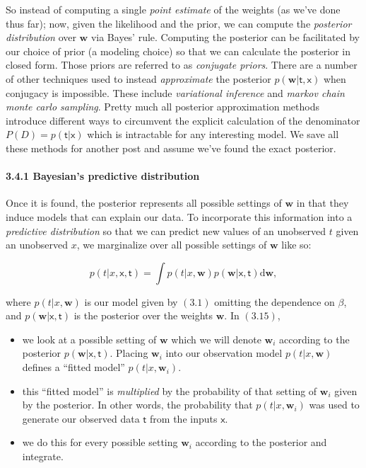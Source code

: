 \documentclass[
  0.875em,
  letterpaper,
  DIV=11,
  numbers=noendperiod]{scrartcl}
\let\oldparagraph\paragraph
\renewcommand{\paragraph}[1]{\oldparagraph{#1}\mbox{}}
\providecommand{\tightlist}{%
  \setlength{\itemsep}{0pt}\setlength{\parskip}{0pt}}\usepackage{longtable,booktabs,array}
\begin{document}
So instead of computing a single \emph{point estimate} of the weights
(as we've done thus far); now, given the likelihood and the prior, we
can compute the \emph{posterior distribution} over \(\mathbf{w}\) via
Bayes' rule. Computing the posterior can be facilitated by our choice of
prior (a modeling choice) so that we can calculate the posterior in
closed form. Those priors are referred to as \emph{conjugate priors}.
There are a number of other techniques used to instead
\emph{approximate} the posterior
\(p(\mathbf{w}|\pmb{\mathsf{t}}, \pmb{\mathsf{x}})\) when conjugacy is
impossible. These include \emph{variational inference} and \emph{markov
chain monte carlo sampling}. Pretty much all posterior approximation
methods introduce different ways to circumvent the explicit calculation
of the denominator \(P(D) = p(\pmb{\mathsf{t}}|\pmb{\mathsf{x}})\) which
is intractable for any interesting model. We save all these methods for
another post and assume we've found the exact posterior.

\hypertarget{bayesians-predictive-distribution}{%
\paragraph{\texorpdfstring{\textbf{3.4.1 Bayesian's predictive
distribution}}{3.4.1 Bayesian's predictive distribution}}\label{bayesians-predictive-distribution}}

Once it is found, the posterior represents all possible settings of
\(\mathbf{w}\) in that they induce models that can explain our data. To
incorporate this information into a \emph{predictive distribution} so
that we can predict new values of an unobserved \(t\) given an
unobserved \(x\), we marginalize over all possible settings of
\(\mathbf{w}\) like so:

\[
p(t|x, \pmb{\mathsf{x}}, \pmb{\mathsf{t}}) = \int p(t|x, \mathbf{w}) p(\mathbf{w}|\pmb{\mathsf{x}}, \pmb{\mathsf{t}}) \text{d}\mathbf{w}, \tag{3.17}
\]

where \(p(t|x, \mathbf{w})\) is our model given by \((3.1)\) omitting
the dependence on \(\beta\), and
\(p(\mathbf{w}|\pmb{\mathsf{x}}, \pmb{\mathsf{t}})\) is the posterior
over the weights \(\mathbf{w}\). In \((3.15)\),

\begin{itemize}
\tightlist
\item
  we look at a possible setting of \(\mathbf{w}\) which we will denote
  \(\mathbf{w}_i\) according to the posterior
  \(p(\mathbf{w}|\pmb{\mathsf{x}}, \pmb{\mathsf{t}})\). Placing
  \(\mathbf{w}_i\) into our observation model \(p(t|x, \mathbf{w})\)
  defines a ``fitted model'' \(p(t|x, \mathbf{w}_i)\).
\item
  this ``fitted model'' is \emph{multiplied} by the probability of that
  setting of \(\mathbf{w}_i\) given by the posterior. In other words,
  the probability that \(p(t|x, \mathbf{w}_i)\) was used to generate our
  observed data \(\pmb{\mathsf{t}}\) from the inputs
  \(\pmb{\mathsf{x}}\).
\item
  we do this for every possible setting \(\mathbf{w}_i\) according to
  the posterior and integrate.
\end{itemize}
\end{document}
